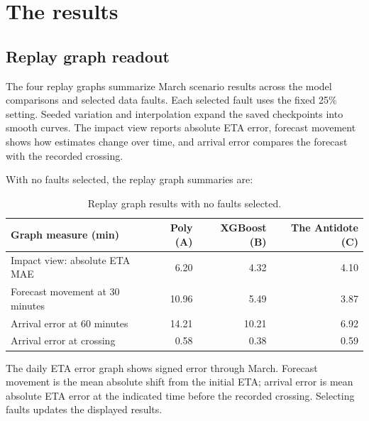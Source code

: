\documentclass[11pt]{article}
\begin{document}
\section{The results}
\subsection{Replay graph readout}
The four replay graphs summarize March scenario results across the model comparisons and selected data faults. Each selected fault uses the fixed 25\% setting. Seeded variation and interpolation expand the saved checkpoints into smooth curves. The impact view reports absolute ETA error, forecast movement shows how estimates change over time, and arrival error compares the forecast with the recorded crossing.

With no faults selected, the replay graph summaries are:
\begin{table}[H]
\centering\small
\begin{tabular}{@{}lrrr@{}}
\toprule
Graph measure (min) & Poly (A) & XGBoost (B) & The Antidote (C) \\
\midrule
Impact view: absolute ETA MAE & 6.20 & 4.32 & 4.10 \\
Forecast movement at 30 minutes & 10.96 & 5.49 & 3.87 \\
Arrival error at 60 minutes & 14.21 & 10.21 & 6.92 \\
Arrival error at crossing & 0.58 & 0.38 & 0.59 \\
\bottomrule
\end{tabular}
\caption{Replay graph results with no faults selected.}
\end{table}

The daily ETA error graph shows signed error through March. Forecast movement is the mean absolute shift from the initial ETA; arrival error is mean absolute ETA error at the indicated time before the recorded crossing. Selecting faults updates the displayed results.
\end{document}

